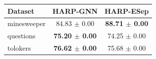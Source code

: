 \begin{tabular}{lcc}
\toprule
Dataset & HARP-GNN & HARP-ESep \\
\midrule
minesweeper & 84.83 $\pm$ 0.00 & \textbf{88.71 $\pm$ 0.00} \\
questions & \textbf{75.20 $\pm$ 0.00} & 74.25 $\pm$ 0.00 \\
tolokers & \textbf{76.62 $\pm$ 0.00} & 75.68 $\pm$ 0.00 \\
\bottomrule
\end{tabular}
